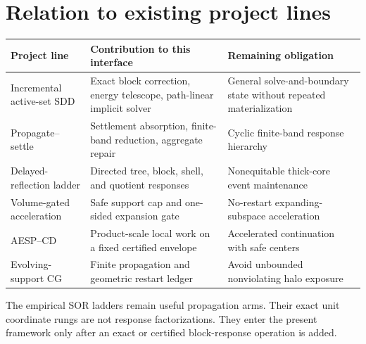 \section{Relation to existing project lines}
\label{sec:map}

\begin{center}
\small
\begin{tabularx}{\textwidth}{@{}p{}p{}X@{}}
\toprule
Project line & Contribution to this interface & Remaining obligation \\
\midrule
Incremental active-set SDD
& Exact block correction, energy telescope, path-linear implicit solver
& General solve-and-boundary state without repeated materialization \\
Propagate--settle
& Settlement absorption, finite-band reduction, aggregate repair
& Cyclic finite-band response hierarchy \\
Delayed-reflection ladder
& Directed tree, block, shell, and quotient responses
& Nonequitable thick-core event maintenance \\
Volume-gated acceleration
& Safe support cap and one-sided expansion gate
& No-restart expanding-subspace acceleration \\
AESP--CD
& Product-scale local work on a fixed certified envelope
& Accelerated continuation with safe centers \\
Evolving-support CG
& Finite propagation and geometric restart ledger
& Avoid unbounded nonviolating halo exposure \\
\bottomrule
\end{tabularx}
\end{center}

The empirical SOR ladders remain useful propagation arms.  Their exact unit
coordinate rungs are not response factorizations.  They enter the present
framework only after an exact or certified block-response operation is added.
